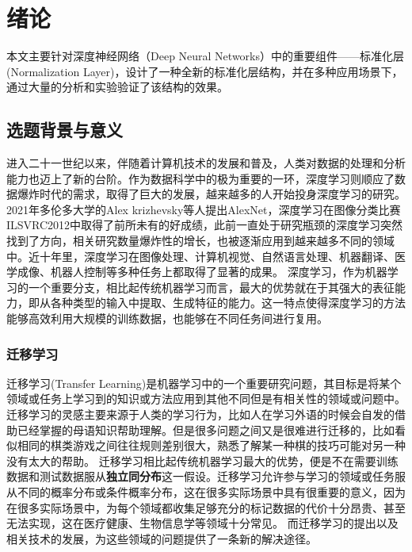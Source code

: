 
\chapter{绪论}

本文主要针对深度神经网络（Deep Neural Networks）中的重要组件——标准化层(Normalization Layer)，设计了一种全新的标准化层结构，并在多种应用场景下，通过大量的分析和实验验证了该结构的效果。

\section{选题背景与意义}
进入二十一世纪以来，伴随着计算机技术的发展和普及，人类对数据的处理和分析能力也迈上了新的台阶。作为数据科学中的极为重要的一环，深度学习则顺应了数据爆炸时代的需求，取得了巨大的发展，越来越多的人开始投身深度学习的研究。
2021年多伦多大学的Alex krizhevsky等人提出AlexNet\citep{krizhevsky2012imagenet}，深度学习在图像分类比赛ILSVRC2012中取得了前所未有的好成绩，此前一直处于研究瓶颈的深度学习突然找到了方向，相关研究数量爆炸性的增长，也被逐渐应用到越来越多不同的领域中。近十年里，深度学习在图像处理、计算机视觉、自然语言处理、机器翻译、医学成像、机器人控制等多种任务上都取得了显著的成果。
深度学习，作为机器学习的一个重要分支，相比起传统机器学习而言，最大的优势就在于其强大的表征能力，即从各种类型的输入中提取、生成特征的能力。这一特点使得深度学习的方法能够高效利用大规模的训练数据，也能够在不同任务间进行复用。

\subsection{迁移学习}
迁移学习(Transfer Learning)是机器学习中的一个重要研究问题，其目标是将某个领域或任务上学习到的知识或方法应用到其他不同但是有相关性的领域或问题中。迁移学习的灵感主要来源于人类的学习行为，比如人在学习外语的时候会自发的借助已经掌握的母语知识帮助理解。但是很多问题之间又是很难进行迁移的，比如看似相同的棋类游戏之间往往规则差别很大，熟悉了解某一种棋的技巧可能对另一种没有太大的帮助。
迁移学习相比起传统机器学习最大的优势，便是不在需要训练数据和测试数据服从\textbf{独立同分布}这一假设。迁移学习允许参与学习的领域或任务服从不同的概率分布或条件概率分布，这在很多实际场景中具有很重要的意义，因为在很多实际场景中，为每个领域都收集足够充分的标记数据的代价十分昂贵、甚至无法实现，这在医疗健康、生物信息学等领域十分常见。
而迁移学习的提出以及相关技术的发展，为这些领域的问题提供了一条新的解决途径。

